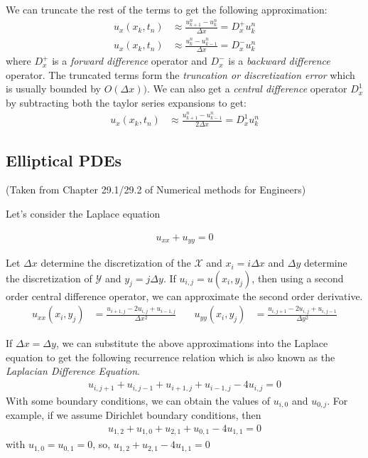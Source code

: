\documentclass[12pt]{article}
\begin{document}
We can truncate the rest of the terms to get the following approximation:
\begin{align*}
    u_x(x_k, t_n) &\approx \frac{u^n_{k + 1} - u^n_{k}}{\Delta x} = D_x^+ u^n_k\\
    u_x(x_k, t_n) &\approx \frac{u^n_{k} - u^n_{k - 1}}{\Delta x} = D_x^- u^n_k
\end{align*}
where $D_x^+$ is a \textit{forward difference} operator and $D_x^-$ is a \textit{backward difference} operator. The truncated terms form the \textit{truncation or discretization error} which is usually bounded by $O(\Delta x))$. We can also get a \textit{central difference} operator $D_x^1$ by subtracting both the taylor series expansions to get:
\begin{align*}
    u_x(x_k, t_n) &\approx \frac{u^n_{k + 1} - u^n_{k - 1}}{2\Delta x} = D_x^1 u^n_k
\end{align*}


\subsection{Elliptical PDEs }


(Taken from Chapter 29.1/29.2 of Numerical methods for Engineers)

Let's consider the Laplace equation

\begin{align*}
    u_{xx} + u_{yy} = 0
\end{align*}

Let $\Delta x$ determine the discretization of the $\mathcal{X}$ and $x_i = i \Delta x$ and $\Delta y$ determine the discretization of $\mathcal{Y}$ and $y_j = j \Delta y$. If $u_{i, j} = u(x_i, y_j)$, then using a second order central difference operator, we can approximate the second order derivative.
\begin{align*}
    u_{xx}(x_i, y_j) &= \frac{u_{i + 1, j} - 2u_{i, j} + u_{i -1, j}}{\Delta x^2 } \quad 
    &u_{yy}(x_i, y_j) &= \frac{u_{i, j + 1} - 2u_{i, j} + u_{i, j- 1}}{\Delta y^2 }
\end{align*}


If $\Delta x = \Delta y$, we can substitute the above approximations into the Laplace equation to get the following recurrence relation which is also known as the \textit{Laplacian Difference Equation}.
\begin{align*}
    u_{i, j + 1} + u_{i, j- 1} + u_{i + 1, j}  + u_{i -1, j} - 4u_{i, j} = 0
\end{align*}
With some boundary conditions, we can obtain the values of $u_{i, 0}$ and $u_{0, j}$. For example, if we assume Dirichlet boundary conditions, then
\begin{align*}
    u_{1, 2} + u_{1, 0} + u_{2, 1} + u_{0, 1} - 4u_{1, 1} = 0
\end{align*}
with $u_{1, 0} = u_{0, 1} = 0$, so, 
$u_{1, 2} + u_{2, 1} - 4u_{1, 1} = 0$
\end{document}
